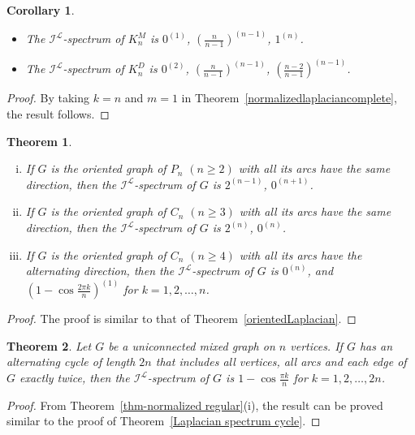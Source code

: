 \documentclass[12pt]{article}
\numberwithin{equation}{section}
\newtheorem{thm}{Theorem}[section]
\newtheorem{cor}{Corollary}[section]
\begin{document}
	\begin{cor}
		\begin{itemize}
			\item[(i)] The $\mathcal{I}^\mathcal{L}$-spectrum of $K^M_n$ is $0^{(1)}$, $(\frac{n}{n-1})^{(n-1)}$, $1^{(n)}$.
			
			\item[(ii)] The $\mathcal{I}^\mathcal{L}$-spectrum of $K^D_n$ is $0^{(2)}$, $(\frac{n}{n-1})^{(n-1)}$, $(\frac{n-2}{n-1})^{(n-1)}$.
		\end{itemize}
	\end{cor}
	\begin{proof}
		By taking $k=n$ and $m=1$ in Theorem~\ref{normalizedlaplaciancomplete}, the result follows.
	\end{proof}
	\begin{thm}
		\begin{enumerate}[(i)]
			\item If $G$ is the oriented graph of $P_n$ $(n\geq 2)$ with all its arcs have the same direction, then the $\mathcal{I}^\mathcal{L}$-spectrum of $G$ is $2^{(n-1)}$, $0^{(n+1)}$.
			
			\item If $G$ is the oriented graph of $C_n$ $(n\geq 3)$ with all its arcs have the same direction, then the $\mathcal{I}^\mathcal{L}$-spectrum of $G$ is $2^{(n)}$, $0^{(n)}$.
			
			\item If $G$ is the oriented graph of $C_n$ $(n\geq 4)$ with all its arcs have the alternating direction, then the $\mathcal{I}^\mathcal{L}$-spectrum of $G$ is $0^{(n)}$, and $(1-\cos\frac{2\pi k}{n})^{(1)}$ for $k=1,2,\ldots,n$.
		\end{enumerate}
	\end{thm}
	\begin{proof}
		The proof is similar to that of Theorem~\ref{orientedLaplacian}.
	\end{proof}
	\begin{thm}Let $G$ be a uniconnected mixed graph on $n$ vertices. If $G$ has an alternating cycle of length $2n$  that includes all  vertices, all  arcs and each edge of $G$ exactly twice, then the $\mathcal{I}^\mathcal{L}$-spectrum of $G$ is $1-\cos\frac{\pi k}{n}$ for $k=1,2,\ldots,2n$.
	\end{thm}
	\begin{proof}
		From Theorem~\ref{thm-normalized regular}(i), the result can be proved similar to the proof of Theorem~\ref{Laplacian spectrum cycle}.
	\end{proof}
\end{document}

